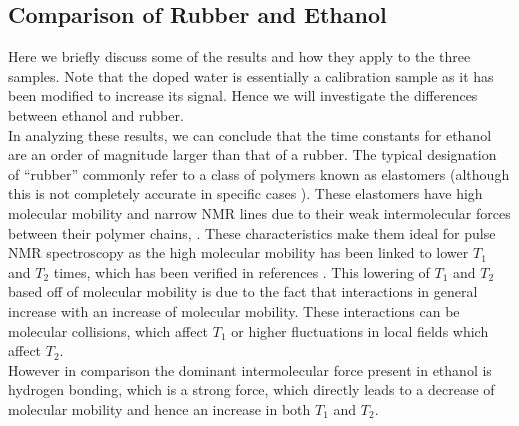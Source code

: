











\subsection{Comparison of Rubber and Ethanol}

Here we briefly discuss some of the results and how they apply to the three samples. Note that the doped water is essentially a calibration sample as it has been modified to increase its signal. Hence we will investigate the differences between ethanol and rubber.\\

In analyzing these results, we can conclude that the time constants for ethanol are an order of magnitude larger than that of a rubber. The typical designation of ``rubber'' commonly refer to a class of polymers known as elastomers (although this is not completely accurate in specific cases \cite{polydict}). These elastomers have high molecular mobility and narrow NMR lines due to their weak intermolecular forces between their polymer chains,  \cite{NMRpoly}. These characteristics make them ideal for pulse NMR spectroscopy as the high molecular mobility has been linked to lower $T_1$ and $T_2$ times, which has been verified in references \cite{polyT1, polyT}. This lowering of $T_1$ and $T_2$ based off of molecular mobility is due to the fact that interactions in general increase with an increase of molecular mobility. These interactions can be molecular collisions, which affect $T_1$ or higher fluctuations in local fields which affect $T_2$.\\

However in comparison the dominant intermolecular force present in ethanol is hydrogen bonding, which is a strong force, which directly leads to a decrease of molecular mobility and hence an increase in both $T_1$ and $T_2$.\\